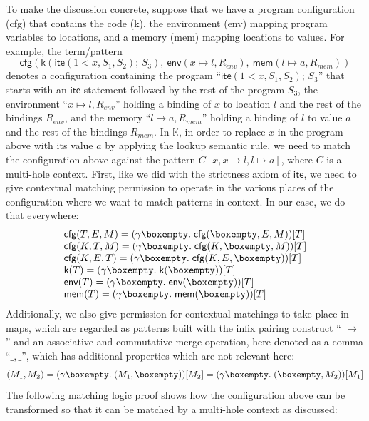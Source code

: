 \documentclass[UTF8,11pt]{article}
\theoremstyle{plain}
\theoremstyle{definition}
\theoremstyle{remark}
\newcommand{\K}{\mbox{$\mathbb{K}$}\xspace}
\newcommand{\hole}{\boxempty}
\newcommand{\ite}{\textsf{ite}}
\begin{document}
To make the discussion concrete, suppose that we have a program configuration
(\textsf{cfg}) that contains the code (\textsf{k}), the environment
(\textsf{env}) mapping program variables to locations,
and a memory (\textsf{mem}) mapping locations to values.
For example, the term/pattern
$$
\textsf{cfg}
(
\textsf{k}(\ite(1 < x,S_1,S_2)\textsf{;\ }S_3),
\ \textsf{env}(x \mapsto l, R_\textit{env})
,
\ \textsf{mem}(l \mapsto a, R_\textit{mem})
)
$$
denotes a configuration containing the program
``$\ite(1 < x,S_1,S_2)\textsf{;\ }S_3$''
that starts with an $\ite$ statement followed by the rest of the program $S_3$,
the environment ``$x \mapsto l, R_\textit{env}$'' holding a binding
of $x$ to location $l$ and the rest of the bindings $R_\textit{env}$,
and the memory ``$l \mapsto a, R_\textit{mem}$'' holding a binding
of $l$ to value $a$ and the rest of the bindings $R_\textit{mem}$.
In \K, in order to replace $x$ in the program above with its value $a$ by
applying the lookup semantic rule, we need to match the configuration above
against the pattern $C[x,x\mapsto l,l\mapsto a]$, where $C$ is a multi-hole
context.
First, like we did with the strictness axiom of $\ite$, we need to give
contextual matching permission to operate in the various places of the
configuration where we want to match patterns in context.
In our case, we do that everywhere:
$$
\begin{array}{l}
\textsf{cfg}(T,E,M) = (\gamma\hole.\;\textsf{cfg}(\hole,E,M))[T]
\\
\textsf{cfg}(K,T,M) = (\gamma\hole.\;\textsf{cfg}(K,\hole,M))[T]
\\
\textsf{cfg}(K,E,T) = (\gamma\hole.\;\textsf{cfg}(K,E,\hole))[T]
\\
\textsf{k}(T) = (\gamma\hole.\;\textsf{k}(\hole))[T]
\\
\textsf{env}(T) = (\gamma\hole.\;\textsf{env}(\hole))[T]
\\
\textsf{mem}(T) = (\gamma\hole.\;\textsf{mem}(\hole))[T]
\end{array}
$$
Additionally, we also give permission for contextual matchings to
take place in maps, which are regarded as patterns built with
the infix pairing construct ``$\_\mapsto\_$'' and an associative and
commutative merge operation, here denoted as a comma ``$\_,\_$'', which
has additional properties which are not relevant here:
$$
(M_1,M_2)
= (\gamma\hole.\;(M_1,\hole))[M_2]
= (\gamma\hole.\;(\hole,M_2))[M_1]
$$
The following matching logic proof shows how the configuration above
can be transformed so that it can be matched by a multi-hole context
as discussed:
\end{document}
